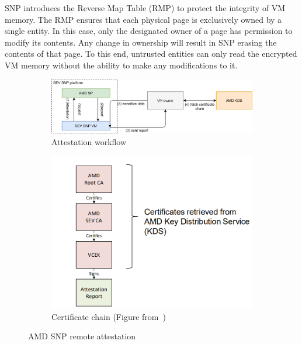 SNP introduces the Reverse Map Table (RMP) to protect the integrity of VM memory. The RMP ensures that each physical page is exclusively owned by a single entity. In this case, only the designated owner of a page has permission to modify its contents. Any change in ownership 
will result in SNP erasing the contents of that page. To this end, untrusted entities can only read the encrypted VM memory without the ability to make any modifications to it.

\begin{figure}[htp]
  \centering
  \begin{subfigure}[b]{0.65\textwidth}
      \centering
      \includegraphics[width=\textwidth]{images/amd_attestation_workflow.PNG}
      \caption{Attestation workflow}
      \label{fig:amd_attestation_workflow}
  \end{subfigure}
  \hfill
  \begin{subfigure}[b]{0.3\textwidth}
      \centering
      \includegraphics[width=\textwidth]{images/amd_snp_certificate_chain.PNG}
      \caption{Certificate chain (Figure from~\cite*{amd_Sev_snp_ppt})}
      \label{fig:amd_snp_certificate_chain}
  \end{subfigure}
  \hfill
     \caption[AMD SNP remote attestation]{AMD SNP remote attestation}
     \label{fig:amd_snp_atteation}
\end{figure}

